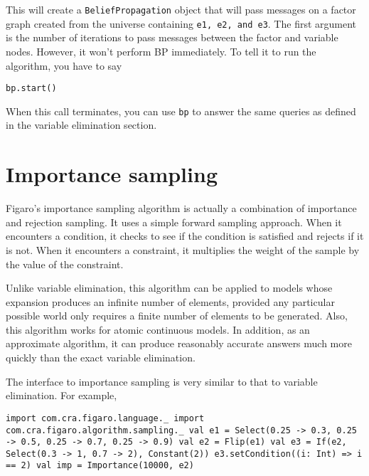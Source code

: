 This will create a \texttt{BeliefPropagation} object that will pass messages on a factor graph created from the universe containing \texttt{e1, e2, and e3}. The first argument is the number of iterations to pass messages between the factor and variable nodes. However, it won't perform BP immediately. To tell it to run the algorithm, you have to say

\begin{flushleft}
\texttt{bp.start()}
\end{flushleft}

When this call terminates, you can use \texttt{bp} to answer the same queries as defined in the variable elimination section.

\section{Importance sampling}

Figaro's importance sampling algorithm is actually a combination of importance and rejection sampling. It uses a simple forward sampling approach. When it encounters a condition, it checks to see if the condition is satisfied and rejects if it is not. When it encounters a constraint, it multiplies the weight of the sample by the value of the constraint.

Unlike variable elimination, this algorithm can be applied to models whose expansion produces an infinite number of elements, provided any particular possible world only requires a finite number of elements to be generated. Also, this algorithm works for atomic continuous models. In addition, as an approximate algorithm, it can produce reasonably accurate answers much more quickly than the exact variable elimination.

The interface to importance sampling is very similar to that to variable elimination. For example,

\begin{flushleft}
\texttt{import com.cra.figaro.language.\_
\newline import com.cra.figaro.algorithm.sampling.\_
\newline
\newline val e1 = Select(0.25 -> 0.3, 0.25 -> 0.5, 0.25 -> 0.7, 0.25 -> 0.9)
\newline val e2 = Flip(e1)
\newline val e3 = If(e2, Select(0.3 -> 1, 0.7 -> 2), Constant(2))
\newline e3.setCondition((i: Int) => i == 2)
\newline 
\newline val imp = Importance(10000, e2) }
\end{flushleft}


